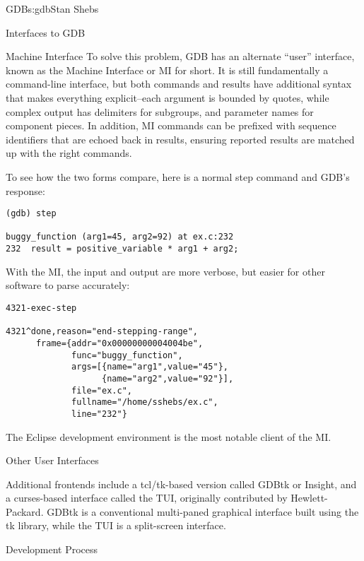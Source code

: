 \begin{aosachapter}{GDB}{s:gdb}{Stan Shebs}
\begin{aosasect1}{Interfaces to GDB}
\begin{aosasect2}{Machine Interface}
To solve this problem, GDB has an alternate ``user'' interface, known
as the Machine Interface or MI for short.  It is still fundamentally a
command-line interface, but both commands and results have additional
syntax that makes everything explicit--each argument is bounded by
quotes, while complex output has delimiters for subgroups, and
parameter names for component pieces.  In addition, MI commands can be
prefixed with sequence identifiers that are echoed back in results,
ensuring reported results are matched up with the right commands.

To see how the two forms compare, here is a normal step command
and GDB's response:

\begin{verbatim}
(gdb) step

buggy_function (arg1=45, arg2=92) at ex.c:232
232  result = positive_variable * arg1 + arg2;
\end{verbatim}

With the MI, the input and output are more verbose, but easier for
other software to parse accurately:

\begin{verbatim}
4321-exec-step

4321^done,reason="end-stepping-range",
      frame={addr="0x00000000004004be",
             func="buggy_function",
             args=[{name="arg1",value="45"},
                   {name="arg2",value="92"}],
             file="ex.c",
             fullname="/home/sshebs/ex.c",
             line="232"}
\end{verbatim}

The Eclipse\cite{bib:eclipse-home} development environment is the most
notable client of the MI.

\end{aosasect2}

\begin{aosasect2}{Other User Interfaces}

Additional frontends include a tcl/tk-based version called GDBtk or
Insight, and a curses-based interface called the TUI, originally
contributed by Hewlett-Packard.  GDBtk is a conventional multi-paned
graphical interface built using the tk library, while the TUI is a
split-screen interface.

\end{aosasect2}

\end{aosasect1}

\begin{aosasect1}{Development Process}


\end{aosasect1}
\end{aosachapter}
